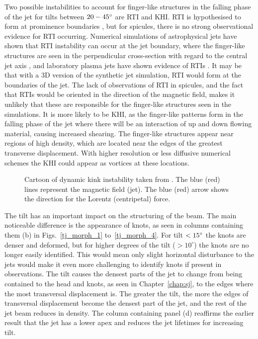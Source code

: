 Two possible instabilities to account for finger-like structures in the falling phase of the jet for tilts between $20-45^{\circ}$ are RTI and KHI. RTI is hypothesised to form at prominence boundaries \citep{Berger2008ApJ676L89B,Berger2010ApJ7161288B,Hillier2012ApJ746120H,Berger2017ApJ85060B}, but for spicules, there is no strong observational evidence for RTI occurring. Numerical simulations of astrophysical jets have shown that RTI instability can occur at the jet boundary, where the finger-like structures are seen in the perpendicular cross-section with regard to the central jet axis \citep{Toma2017MNRAS4721253T,Matsumoto2017MNRAS4721421M}, and laboratory plasma jets have shown evidence of RTIs \citep{Zhai2016PhPl23c2121Z}. It may be that with a 3D version of the synthetic jet simulation, RTI would form at the boundaries of the jet. The lack of observations of RTI in spicules, and the fact that RTIs would be oriented in the direction of the magnetic field, makes it unlikely that these are responsible for the finger-like structures seen in the simulations. It is more likely to be KHI, as the finger-like patterns form in the falling phase of the jet where there will be an interaction of up and down flowing material, causing increased shearing. The finger-like structures appear near regions of high density, which are located near the edges of the greatest transverse displacement. With higher resolution or less diffusive numerical schemes the KHI could appear as vortices at these locations. \np
%
\begin{figure}
\captionsetup[subfigure]{labelformat=empty}
\centering
{}
\caption{Cartoon of dynamic kink instability taken from \cite{Zaqarashvili2020ApJ893L46Z}. The blue (red) lines represent the magnetic field (jet). The blue (red) arrow shows the direction for the Lorentz (centripetal) force.}
\label{DKI_example}
\end{figure}
The tilt has an important impact on the structuring of the beam. The main noticeable difference is the appearance of knots, as seen in columns containing them (b) in Figs.~\ref{tj_morph_1} to~\ref{tj_morph_4}. For tilt $<15^{\circ}$ the knots are denser and deformed, but for higher degrees of the tilt ($> 10^{\circ}$) the knots are no longer easily identified. This would mean only slight horizontal disturbance to the jets would make it even more challenging to identify knots if present in observations. The tilt causes the densest parts of the jet to change from being contained to the head and knots, as seen in Chapter~\ref{chap:sj}, to the edges where the most transversal displacement is. The greater the tilt, the more the edges of transversal displacement become the densest part of the jet, and the rest of the jet beam reduces in density. The column containing panel (d) reaffirms the earlier result that the jet has a lower apex and reduces the jet lifetimes for increasing tilt. \np
